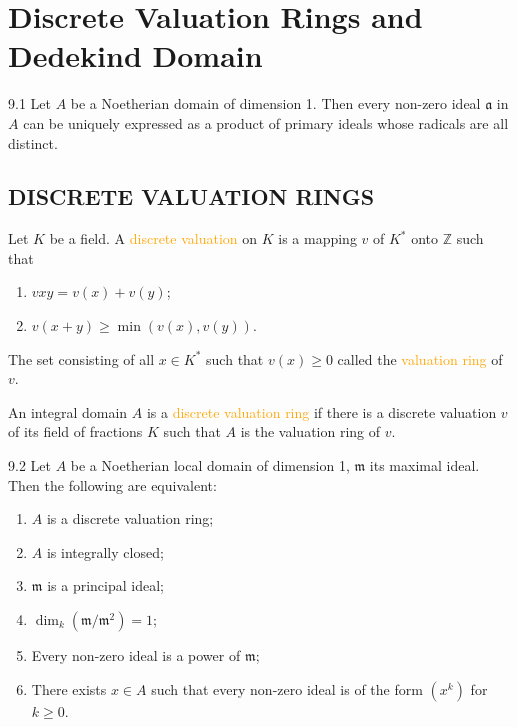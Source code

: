 \chapter{Discrete Valuation Rings and Dedekind Domain}

\begin{proposition}{9.1}
	Let $A$ be a Noetherian domain of dimension 1. Then every non-zero ideal $\mathfrak{a}$ in $A$ can be uniquely expressed as a product of primary ideals whose radicals are all distinct.
\end{proposition}

\section*{DISCRETE VALUATION RINGS}

Let $K$ be a field. A \textcolor{orange}{discrete valuation} on $K$ is a mapping $v$ of $K^*$ onto $\mathbb{Z}$ such that
\begin{enumerate}[label=\textup{(\arabic*)}]
	\item $v{xy}=v(x)+v(y)$;
	\item $v(x+y)\geqslant\min\left(v(x),v(y)\right)$.
\end{enumerate}
The set consisting of all $x\in K^*$ such that $v(x)\geqslant0$ called the \textcolor{orange}{valuation ring} of $v$.

An integral domain $A$ is a \textcolor{orange}{discrete valuation ring} if there is a discrete valuation $v$ of its field of fractions $K$ such that $A$ is the valuation ring of $v$.

\begin{proposition}{9.2}
	Let $A$ be a Noetherian local domain of dimension 1, $\mathfrak{m}$ its maximal ideal. Then the following are equivalent:
	\begin{enumerate}[label=\textup{(\roman*)},ref=\thepropositiontemp(\roman*)]
		\item\label{9.2.1} $A$ is a discrete valuation ring;
		\item\label{9.2.2} $A$ is integrally closed;
		\item\label{9.2.3} $\mathfrak{m}$ is a principal ideal;
		\item\label{9.2.4} $\dim_k\left(\mathfrak{m}/\mathfrak{m^2}\right)=1$;
		\item\label{9.2.5} Every non-zero ideal is a power of $\mathfrak{m}$;
		\item\label{9.2.6} There exists $x\in A$ such that every non-zero ideal is of the form $\left(x^k\right)$ for $k\geqslant0$.
	\end{enumerate}
\end{proposition}

